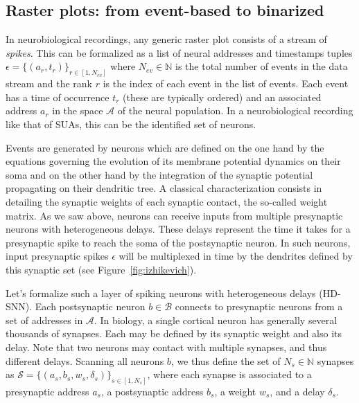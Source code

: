 \documentclass[runningheads]{llncs}
\newcommand{\presynaddr}{a} %
\newcommand{\postsynaddr}{b} %
\newcommand{\numevent}{N_{ev}} %
\newcommand{\presynaddrspace}{\mathcal{A}} %
\newcommand{\postsynaddrspace}{\mathcal{B}} %
\newcommand{\arank}{r} %
\newcommand{\synapse}{\mathcal{S}} %
\newcommand{\synapticweight}{w} %
\newcommand{\synapticdelay}{\delta} %
\newcommand{\ranksyn}{s} %
\newcommand{\Nsyn}{N_{s}} %
\newcommand{\timev}{t} %
\newcommand{\event}{\epsilon} %
\begin{document}
\subsection{Raster plots: from event-based to binarized}
%
In neurobiological recordings, %
any generic raster plot consists of a stream of \emph{spikes}. This can be formalized as a list of neural addresses and timestamps tuples $\event = \{(\presynaddr_\arank, \timev_\arank)\}_{\arank \in [1,\numevent]}$ where $\numevent \in \mathbb{N}$ is the total number of events in the data stream and the rank $\arank$ is the index of each event in the list of events. Each event has a time of occurrence $\timev_\arank$ (these are typically ordered) and an associated address $\presynaddr_\arank$ in the space $\presynaddrspace$ of the neural population. In a neurobiological recording like that of SUAs, this can be the identified set of neurons.

Events are generated by neurons which are defined on the one hand by the equations governing the evolution of its membrane potential dynamics on their soma and on the other hand by the integration of the synaptic potential propagating on their dendritic tree. A classical characterization consists in detailing the synaptic weights of each synaptic contact, the so-called weight matrix. As we saw above, neurons can receive inputs from multiple presynaptic neurons with heterogeneous delays. These delays represent the time it takes for a presynaptic spike to reach the soma of the postsynaptic neuron. 
In such neurons, %
input presynaptic spikes $\event$ will be multiplexed in time by the dendrites defined by this synaptic set (see Figure~\ref{fig:izhikevich}). %

Let's formalize such a layer of spiking neurons with heterogeneous delays (HD-SNN). Each postsynaptic neuron $\postsynaddr \in \postsynaddrspace$  connects to presynaptic neurons from a set of addresses in  $\presynaddrspace$. In biology, a single cortical neuron has generally several thousands of synapses. Each may be defined by its synaptic weight and also its delay. %
Note that two neurons may contact with multiple synapses, and thus different delays. Scanning all neurons $\postsynaddr$, we thus define the set of $\Nsyn \in \mathbb{N}$ synapses  as  $\synapse = \{(\presynaddr_\ranksyn, \postsynaddr_\ranksyn, \synapticweight_\ranksyn, \synapticdelay_\ranksyn)\}_{\ranksyn \in [1,\Nsyn]}$, where each synapse is associated to a presynaptic address $\presynaddr_\ranksyn$, a postsynaptic address $\postsynaddr_\ranksyn$,  a weight $\synapticweight_\ranksyn$, and a delay $\synapticdelay_\ranksyn$. 
\end{document}
